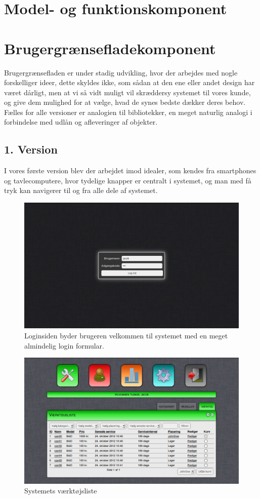 \documentclass{article}
\begin{document}
\section{Model- og funktionskomponent}

\section{Brugergrænsefladekomponent}
Brugergrænsefladen er under stadig udvikling, hvor der arbejdes med nogle forskelliger ideer, dette skyldes ikke, som sådan at den ene eller andet design har været dårligt, men at vi så vidt muligt vil skræddersy systemet til vores kunde, og give dem mulighed for at vælge, hvad de synes bedste dækker deres behov. Fælles for alle versioner er analogien til bibliotekker, en meget naturlig analogi i forbindelse med udlån og afleveringer af objekter.   
\subsection{1. Version}
I vores første version blev der arbejdet imod idealer, som kendes fra smartphones og tavlecomputere, hvor tydelige knapper er centralt i systemet, og man med få tryk kan navigerer til og fra alle dele af systemet. 

\begin{figure}[H]
\includegraphics[scale=0.40]{./figures/loginpage.png}
\caption{Loginsiden byder brugeren velkommen til systemet med en meget almindelig login formular.}
\end{figure}


\begin{figure}[H]
\includegraphics[scale=0.40]{./figures/tools.png}
\caption{Systemets værktøjsliste}
\end{figure}
\end{document}
